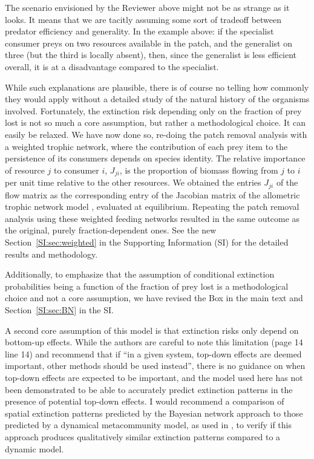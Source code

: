 \documentclass[11pt]{article}
\newcommand{\SI}{SI}
\newcommand{\us}{\rm \setlength{\leftskip}{0.3cm} \setlength{\rightskip}{0.3cm}}
\newcommand{\them}{\it \setlength{\leftskip}{0cm} \setlength{\rightskip}{0cm}}
\begin{document}
\us

The scenario envisioned by the Reviewer above might not be as strange as it looks. It means that we are tacitly assuming some sort of tradeoff between predator efficiency and generality. In the example above: if the specialist consumer preys on two resources available in the patch, and the generalist on three (but the third is locally absent), then, since the generalist is less efficient overall, it is at a disadvantage compared to the specialist.

While such explanations are plausible, there is of course no telling how commonly they would apply without a detailed study of the natural history of the organisms involved. Fortunately, the extinction risk depending only on the fraction of prey lost is not so much a core assumption, but rather a methodological choice. It can easily be relaxed. We have now done so, re-doing the patch removal analysis with a weighted trophic network, where the contribution of each prey item to the persistence of its consumers depends on species identity. The relative importance of resource $j$ to consumer $i$, $J_{ji}$, is the proportion of biomass flowing from $j$ to $i$ per unit time relative to the other resources. We obtained the entries $J_{ji}$ of the flow matrix as the corresponding entry of the Jacobian matrix of the allometric trophic network model \citep{Schneider2016, Ryser2019}, evaluated at equilibrium. Repeating the patch removal analysis using these weighted feeding networks resulted in the same outcome as the original, purely fraction-dependent ones. See the new Section~\ref{SI:sec:weighted} in the Supporting Information (\SI) for the detailed results and methodology.

Additionally, to emphasize that the assumption of conditional extinction probabilities being a function of the fraction of prey lost is a methodological choice and not a core assumption, we have revised the Box in the main text and Section~\ref{SI:sec:BN} in the \SI.

\them

A second core assumption of this model is that extinction risks only depend on bottom-up effects. While the authors are careful to note this limitation (page 14 line 14) and recommend that if ``in a given system, top-down effects are deemed important, other methods should be used instead'', there is no guidance on when top-down effects are expected to be important, and the model used here has not been demonstrated to be able to accurately predict extinction patterns in the presence of potential top-down effects. I would recommend a comparison of spatial extinction patterns predicted by the Bayesian network approach to those predicted by a dynamical metacommunity model, as used in \citet{Ryser2019}, to verify if this approach produces qualitatively similar extinction patterns compared to a dynamic model.
\end{document}
